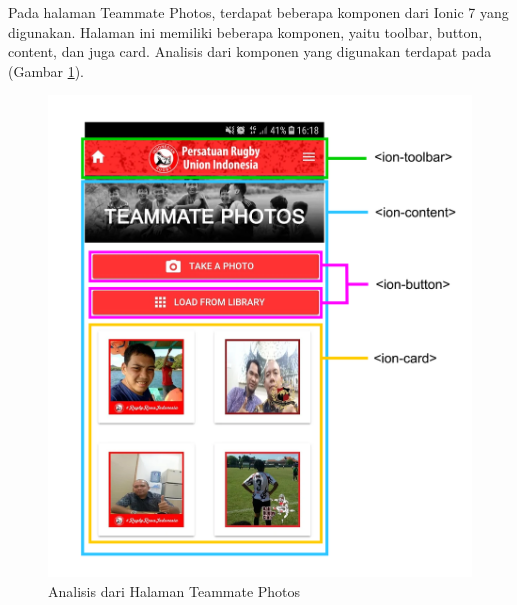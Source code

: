 Pada halaman Teammate Photos, terdapat beberapa komponen dari Ionic 7 yang digunakan. Halaman ini memiliki beberapa komponen, yaitu toolbar, button, content, dan juga card. Analisis dari komponen yang digunakan terdapat pada (Gambar \ref{fig:teammate-photos-analytics}).

\begin{figure} [H]
    \centering
    \includegraphics[scale=0.1]{Gambar/teammates_photos-analytics.png}
    \caption{Analisis dari Halaman Teammate Photos}
    \label{fig:teammate-photos-analytics}
\end{figure}



